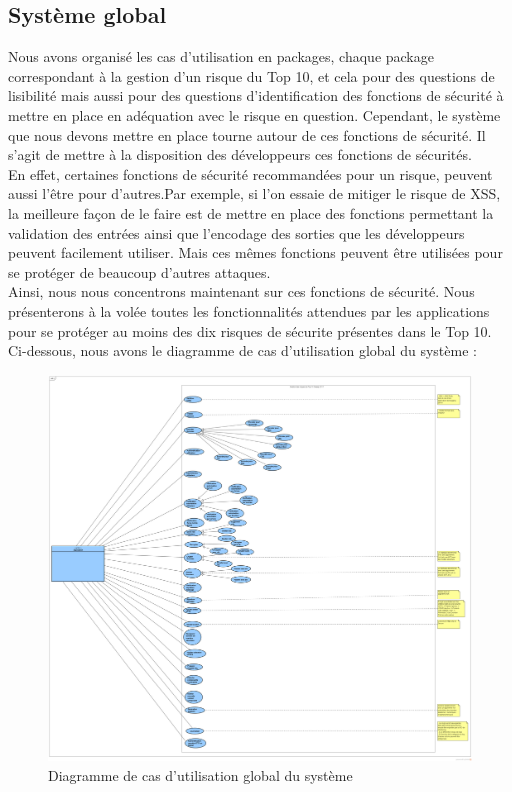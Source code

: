 \subsection{Système global}
Nous avons organisé les cas d'utilisation en packages, chaque package correspondant à la gestion d'un risque du Top 10, et cela pour des questions de lisibilité mais aussi pour des questions d'identification des fonctions de sécurité à mettre en place en adéquation avec le risque en question. Cependant, le système que nous devons mettre en place tourne autour de ces fonctions de sécurité. Il s'agit de mettre à la disposition des développeurs ces fonctions de sécurités. \\
En effet, certaines fonctions de sécurité recommandées pour un risque, peuvent aussi l'être pour d'autres.Par exemple, si l'on essaie de mitiger le risque de XSS, la meilleure façon de le faire est de mettre en place des fonctions permettant la validation des entrées ainsi que l'encodage des sorties que les développeurs peuvent facilement utiliser. Mais ces mêmes fonctions peuvent être utilisées pour se protéger de beaucoup  d’autres attaques. \\
Ainsi, nous nous concentrons maintenant sur ces fonctions de sécurité. Nous présenterons à la volée toutes les fonctionnalités attendues par les applications pour se protéger au moins des dix risques de sécurite présentes dans le Top 10.\\
Ci-dessous, nous avons le diagramme de cas d'utilisation global du système :
\begin{figure}[H]
	\centering
	\includegraphics[width=1.0\textwidth,height=0.95\textheight]{fig/Global-use-case-diagram.png}
	\caption{Diagramme de cas d'utilisation global du système}
	\label{fig:7.12}
\end{figure}
